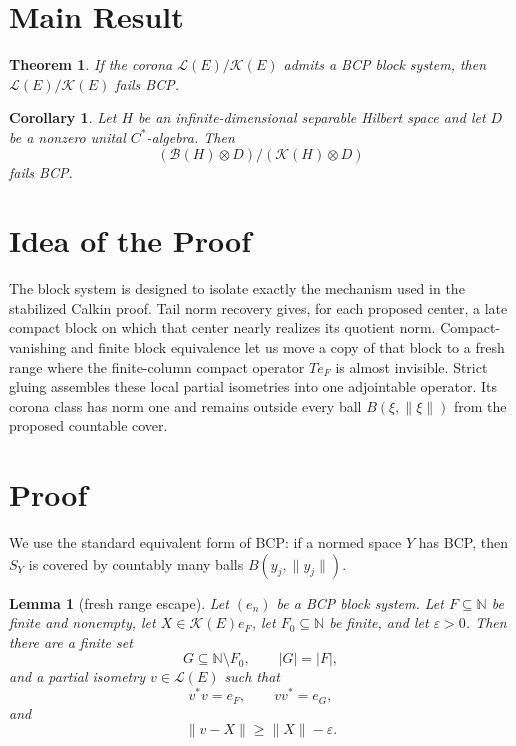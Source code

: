 \documentclass[11pt]{article}
\newtheorem{theorem}{Theorem}
\newtheorem{lemma}{Lemma}
\newtheorem{corollary}{Corollary}
\newcommand{\Lcal}{\mathcal L}
\newcommand{\Kcal}{\mathcal K}
\newcommand{\B}{\mathcal B}
\newcommand{\K}{\mathcal K}
\newcommand{\N}{\mathbb N}
\begin{document}
\section*{Main Result}

\begin{theorem}
\label{thm:block-criterion}
If the corona \(\Lcal(E)/\Kcal(E)\) admits a BCP block system, then
\(\Lcal(E)/\Kcal(E)\) fails BCP.
\end{theorem}

\begin{corollary}
\label{cor:unital-recovered}
Let \(H\) be an infinite-dimensional separable Hilbert space and let \(D\) be a
nonzero unital \(C^*\)-algebra.  Then
\[
        (\B(H)\otimes D)/(\K(H)\otimes D)
\]
fails BCP.
\end{corollary}

\section*{Idea of the Proof}

The block system is designed to isolate exactly the mechanism used in the
stabilized Calkin proof.  Tail norm recovery gives, for each proposed center,
a late compact block on which that center nearly realizes its quotient norm.
Compact-vanishing and finite block equivalence let us move a copy of that
block to a fresh range where the finite-column compact operator \(T e_F\) is
almost invisible.  Strict gluing assembles these local partial isometries into
one adjointable operator.  Its corona class has norm one and remains outside
every ball \(B(\xi,\|\xi\|)\) from the proposed countable cover.

\section*{Proof}

We use the standard equivalent form of BCP: if a normed space \(Y\) has BCP,
then \(S_Y\) is covered by countably many balls \(B(y_j,\|y_j\|)\).

\begin{lemma}[fresh range escape]
\label{lem:fresh-range}
Let \((e_n)\) be a BCP block system.  Let \(F\subseteq\N\) be finite and
nonempty, let \(X\in \Kcal(E)e_F\), let \(F_0\subseteq\N\) be finite, and let
\(\varepsilon>0\).  Then there are a finite set
\[
        G\subseteq\N\setminus F_0,\qquad |G|=|F|,
\]
and a partial isometry \(v\in\Lcal(E)\) such that
\[
        v^*v=e_F,\qquad vv^*=e_G,
\]
and
\[
        \|v-X\|\ge \|X\|-\varepsilon.
\]
\end{lemma}
\end{document}
